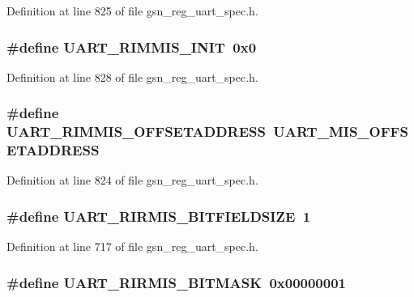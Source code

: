 Definition at line 825 of file gsn\_\-reg\_\-uart\_\-spec.h.

\hypertarget{a00575_a6393b8e1638180e038d93e526807c70c}{
\subsubsection[{UART\_\-RIMMIS\_\-INIT}]{\setlength{\rightskip}{0pt plus 5cm}\#define UART\_\-RIMMIS\_\-INIT~0x0}}
\label{a00575_a6393b8e1638180e038d93e526807c70c}


Definition at line 828 of file gsn\_\-reg\_\-uart\_\-spec.h.

\hypertarget{a00575_a5fbe41f44aed15ddec262b6eba6022fa}{
\subsubsection[{UART\_\-RIMMIS\_\-OFFSETADDRESS}]{\setlength{\rightskip}{0pt plus 5cm}\#define UART\_\-RIMMIS\_\-OFFSETADDRESS~UART\_\-MIS\_\-OFFSETADDRESS}}
\label{a00575_a5fbe41f44aed15ddec262b6eba6022fa}


Definition at line 824 of file gsn\_\-reg\_\-uart\_\-spec.h.

\hypertarget{a00575_a3ecc630eb2fb9ac2a17c062d6edb2c39}{
\subsubsection[{UART\_\-RIRMIS\_\-BITFIELDSIZE}]{\setlength{\rightskip}{0pt plus 5cm}\#define UART\_\-RIRMIS\_\-BITFIELDSIZE~1}}
\label{a00575_a3ecc630eb2fb9ac2a17c062d6edb2c39}


Definition at line 717 of file gsn\_\-reg\_\-uart\_\-spec.h.

\hypertarget{a00575_a7ee397a94f9a55592a64dfae9a60e793}{
\subsubsection[{UART\_\-RIRMIS\_\-BITMASK}]{\setlength{\rightskip}{0pt plus 5cm}\#define UART\_\-RIRMIS\_\-BITMASK~0x00000001}}
\label{a00575_a7ee397a94f9a55592a64dfae9a60e793}


